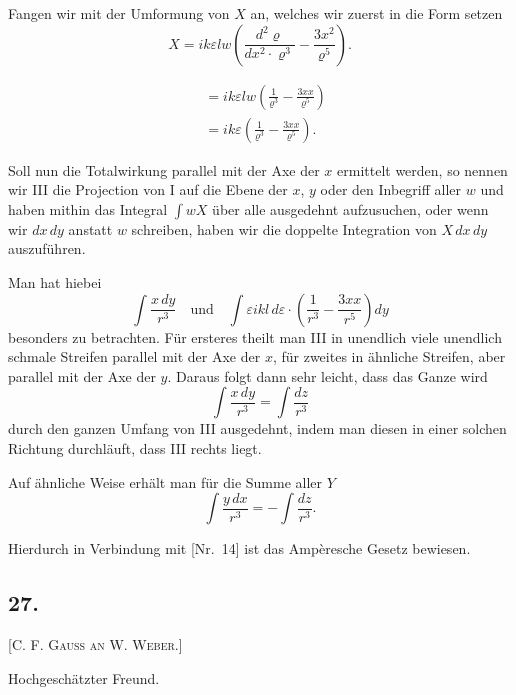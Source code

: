 \documentclass[fontsize=10pt,paper=a5,pagesize=auto]{scrbook}
\newcommand{\origpage}[1]{\marginpar{\footnotesize\textit{S. #1}}}
\begin{document}
Fangen wir mit der Umformung von $X$ an, welches wir zuerst in die Form setzen
\[
X = ik\varepsilon lw \left( \frac{d^2 \varrho}{dx^2 \cdot \varrho^3} - \frac{3x^2}{\varrho^5} \right).
\]

\origpage{632}
\begin{align*}
&= ik\varepsilon lw \left( \frac{1}{\varrho^3} - \frac{3xx}{\varrho^5} \right) \\
&= ik\varepsilon \left( \frac{1}{\varrho^3} - \frac{3xx}{\varrho^5} \right).
\end{align*}

Soll nun die Totalwirkung parallel mit der Axe der $x$ ermittelt werden, so nennen wir III die Projection von I auf die Ebene der $x$, $y$ oder den Inbegriff aller $w$ und haben mithin das Integral $\int wX$ über alle ausgedehnt aufzusuchen, oder wenn wir $dx \, dy$ anstatt $w$ schreiben, haben wir die doppelte Integration von $X \, dx \, dy$ auszuführen.

Man hat hiebei
\[
\int \frac{x \, dy}{r^3} \quad \text{und} \quad \int \varepsilon ikl \, d\varepsilon \cdot \left(\frac{1}{r^3} - \frac{3xx}{r^5}\right) dy
\]
besonders zu betrachten. Für ersteres theilt man III in unendlich viele unendlich schmale Streifen parallel mit der Axe der $x$, für zweites in ähnliche Streifen, aber parallel mit der Axe der $y$. Daraus folgt dann sehr leicht, dass das Ganze wird
\[
\int \frac{x \, dy}{r^3} = \int \frac{dz}{r^3}
\]
durch den ganzen Umfang von III ausgedehnt, indem man diesen in einer solchen Richtung durchläuft, dass III rechts liegt.

Auf ähnliche Weise erhält man für die Summe aller $Y$
\[
\int \frac{y \, dx}{r^3} = -\int \frac{dz}{r^3}.
\]

Hierdurch in Verbindung mit [Nr.~14] ist das Ampèresche Gesetz bewiesen.


\subsection*{27.}
\origpage{633}
\textsc{[C. F. Gauss an W. Weber.]}

\begin{otherlanguage}{ngerman}
Hochgeschätzter Freund.
\end{otherlanguage}
\end{document}
